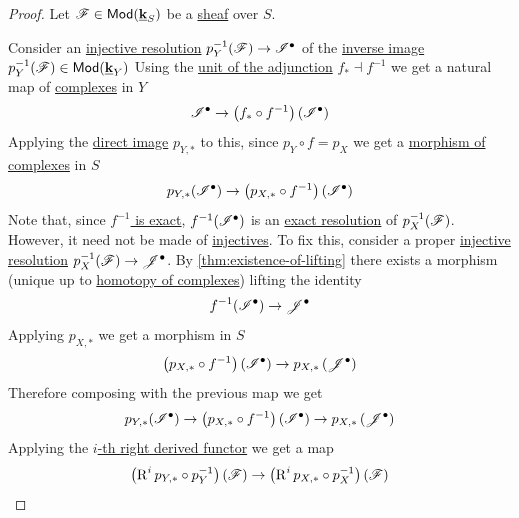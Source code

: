 \documentclass[../../main]{subfiles}
\begin{document}
\begin{proof}
  Let \(\mathscr{F} \in \mathsf{Mod}(\underline{\mathbf{k}}_{S})\) be a \hyperref[def:sheaf]{sheaf} over \(S\).

  Consider an \hyperref[def:resolution]{injective resolution} \(p_{Y}^{-1}(\mathscr{F}) \to \mathscr{I}^{\bullet}\) of the \hyperref[def:inverse-image-sheaf]{inverse image} \(p_{Y}^{-1}(\mathscr{F}) \in \mathsf{Mod}(\underline{\mathbf{k}}_{Y})\)
  Using the \hyperref[def:unit-counit]{unit of the adjunction} \hyperref[thm:direct-inverse-image-adjunction-sheaf]{\(f_{\ast} \dashv f^{-1}\)} we get a natural map of \hyperref[def:complex]{complexes} in \(Y\)
  \begin{equation*}
    \mathscr{I}^{\bullet} \to \left( f_{\ast} \circ f^{-1} \right) \left( \mathscr{I}^{\bullet} \right)
  \end{equation*}
  Applying the \hyperref[def:direct-image-sheaf]{direct image} \(p_{Y, \ast}\) to this, since \(p_{Y} \circ f = p_{X}\) we get a \hyperref[def:complex]{morphism of complexes} in \(S\)
   \begin{equation*}
    p_{Y, \ast}(\mathscr{I}^{\bullet}) \to \left( p_{X, \ast} \circ f^{-1} \right) \left( \mathscr{I}^{\bullet} \right)
  \end{equation*}
  Note that, since \hyperref[cor:inverse-image-sheaf-exact]{\(f^{-1}\) is exact}, \(f^{-1}(\mathscr{I}^{\bullet})\) is an \hyperref[def:exact-sequence]{exact resolution} of \(p_{X}^{-1}(\mathscr{F})\).
  However, it need not be made of \hyperref[def:injective-projective-object]{injectives}.
  To fix this, consider a proper \hyperref[def:resolution]{injective resolution} \(p_{X}^{-1}(\mathscr{F}) \to \mathscr{J}^{\bullet}\).
  By \autoref{thm:existence-of-lifting} there exists a morphism (unique up to \hyperref[def:homotopy]{homotopy of complexes}) lifting the identity
  \begin{equation*}
    f^{-1}(\mathscr{I}^{\bullet}) \to \mathscr{J}^{\bullet}
  \end{equation*}
  Applying \(p_{X, \ast}\) we get a morphism in \(S\)
  \begin{equation*}
    \left( p_{X, \ast} \circ f^{-1} \right) \left(\mathscr{I}^{\bullet}\right) \to p_{X, \ast}\left(\mathscr{J}^{\bullet}\right)
  \end{equation*}
  Therefore composing with the previous map we get
  \begin{equation*}
    p_{Y, \ast}(\mathscr{I}^{\bullet}) \to \left( p_{X, \ast} \circ f^{-1} \right) \left( \mathscr{I}^{\bullet} \right) \to p_{X, \ast} \left( \mathscr{J}^{\bullet} \right)
  \end{equation*}
  Applying the \hyperref[def:right-derived-functor]{\(i\)-th right derived functor} we get a map
   \begin{equation*}
    \left(\operatorname{R}^{i}p_{Y, \ast} \circ p_{Y}^{-1}\right)(\mathscr{F}) \to \left(\operatorname{R}^{i}p_{X, \ast} \circ p_{X}^{-1} \right)(\mathscr{F}) \qedhere
  \end{equation*} 
\end{proof}
\end{document}

